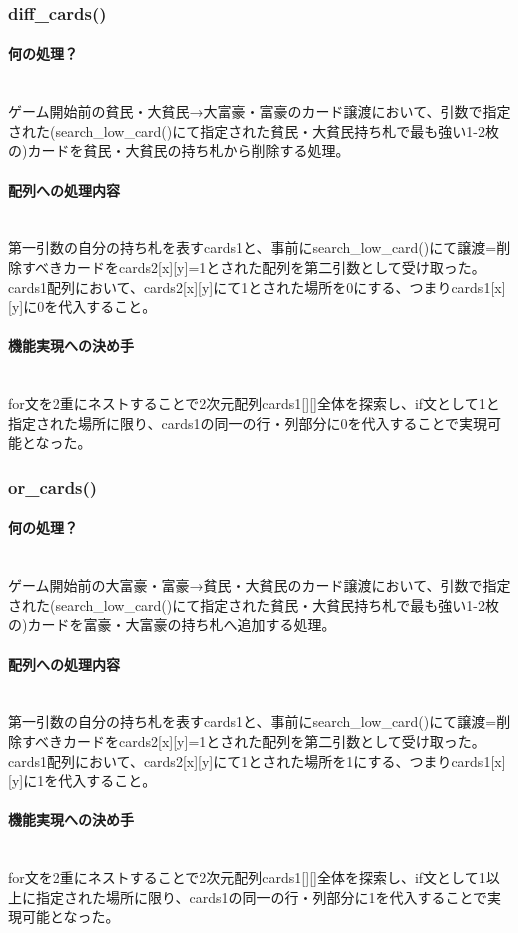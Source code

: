 \documentclass[11pt,a4paper, uplatex]{jsarticle}
\begin{document}
\subsubsection{diff\_cards()}
\paragraph{何の処理？}\mbox{}\\
ゲーム開始前の貧民・大貧民→大富豪・富豪のカード譲渡において、引数で指定された(search\_low\_card()にて指定された貧民・大貧民持ち札で最も強い1-2枚の)カードを貧民・大貧民の持ち札から削除する処理。
\paragraph{配列への処理内容}\mbox{}\\
第一引数の自分の持ち札を表すcards1と、事前にsearch\_low\_card()にて譲渡=削除すべきカードをcards2[x][y]=1とされた配列を第二引数として受け取った。cards1配列において、cards2[x][y]にて1とされた場所を0にする、つまりcards1[x][y]に0を代入すること。
\paragraph{機能実現への決め手}\mbox{}\\
for文を2重にネストすることで2次元配列cards1[][]全体を探索し、if文として1と指定された場所に限り、cards1の同一の行・列部分に0を代入することで実現可能となった。
%
\subsubsection{or\_cards()}
\paragraph{何の処理？}\mbox{}\\
ゲーム開始前の大富豪・富豪→貧民・大貧民のカード譲渡において、引数で指定された(search\_low\_card()にて指定された貧民・大貧民持ち札で最も強い1-2枚の)カードを富豪・大富豪の持ち札へ追加する処理。
\paragraph{配列への処理内容}\mbox{}\\
第一引数の自分の持ち札を表すcards1と、事前にsearch\_low\_card()にて譲渡=削除すべきカードをcards2[x][y]=1とされた配列を第二引数として受け取った。cards1配列において、cards2[x][y]にて1とされた場所を1にする、つまりcards1[x][y]に1を代入すること。
\paragraph{機能実現への決め手}\mbox{}\\
for文を2重にネストすることで2次元配列cards1[][]全体を探索し、if文として1以上に指定された場所に限り、cards1の同一の行・列部分に1を代入することで実現可能となった。
%
\end{document}
